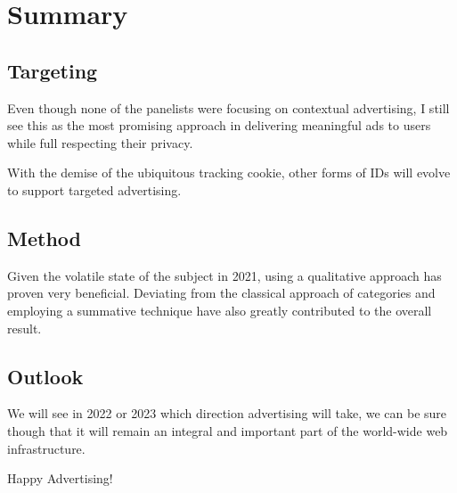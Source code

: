 %
%

\pagebreak
\section{Summary}

\onehalfspacing

\subsection{Targeting}

Even though none of the panelists were focusing on contextual advertising, I still see this as the most promising approach in delivering meaningful ads to users while full respecting their privacy.

With the demise of the ubiquitous tracking cookie, other forms of IDs will evolve to support targeted advertising.

\subsection{Method}

Given the volatile state of the subject in 2021, using a qualitative approach has proven very beneficial. Deviating from the classical approach of categories and employing a summative technique have also greatly contributed to the overall result.

\subsection{Outlook}

We will see in 2022 or 2023 which direction advertising will take, we can be sure though that it will remain an integral and important part of the world-wide web infrastructure.

Happy Advertising!
